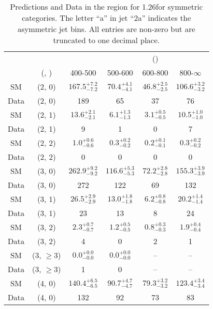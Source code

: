 \begin{table}[h!]
\tiny
\centering
\caption{Predictions and Data in the \gj region for 1.26\ifb for symmetric categories. The letter ``a'' in jet \eg ``2a''  indicates the asymmetric jet bins. All entries are non-zero but are truncated to one decimal place.\label{tab:yieldsewkdatapost_gj_comb_sym}}
\begin{tabular}
{cccccc}
	\hline\hline
&	&	& \multicolumn{4}{c}{\scalht (\gev)}\\ 
	&	 (\njet, \nb) & 400-500 & 500-600 & 600-800 & 800-$\infty$ \\ [0.8ex] 
\hline
	SM & (2, 0) & $167.5^{+ 7.2 }_{- 7.2 }$ & $70.4^{+ 4.1 }_{- 4.1 }$ & $46.8^{+ 2.5 }_{- 2.5 }$ & $106.6^{+ 3.2 }_{- 3.2 }$ \\[0.5ex] 
	Data & (2, 0) & 189 & 65 & 37 & 76 \\[0.5ex] 
	SM & (2, 1) & $13.6^{+ 2.1 }_{- 2.1 }$ & $6.1^{+ 1.3 }_{- 1.3 }$ & $3.1^{+ 0.5 }_{- 0.5 }$ & $10.5^{+ 1.0 }_{- 1.0 }$ \\[0.5ex] 
	Data & (2, 1) & 9 & 1 & 0 & 7 \\[0.5ex] 
	SM & (2, 2) & $1.0^{+ 0.6 }_{- 0.6 }$ & $0.3^{+ 0.2 }_{- 0.2 }$ & $0.2^{+ 0.1 }_{- 0.1 }$ & $0.3^{+ 0.2 }_{- 0.2 }$ \\[0.5ex] 
	Data & (2, 2) & 0 & 0 & 0 & 0 \\[0.5ex] 
	SM & (3, 0) & $262.9^{+ 9.2 }_{- 9.2 }$ & $116.6^{+ 5.3 }_{- 5.3 }$ & $72.2^{+ 2.8 }_{- 2.8 }$ & $155.3^{+ 3.9 }_{- 3.9 }$ \\[0.5ex] 
	Data & (3, 0) & 272 & 122 & 69 & 132 \\[0.5ex] 
	SM & (3, 1) & $26.5^{+ 2.9 }_{- 2.9 }$ & $13.0^{+ 1.8 }_{- 1.8 }$ & $6.2^{+ 0.8 }_{- 0.8 }$ & $20.2^{+ 1.4 }_{- 1.4 }$ \\[0.5ex] 
	Data & (3, 1) & 23 & 13 & 8 & 24 \\[0.5ex] 
	SM & (3, 2) & $2.3^{+ 0.7 }_{- 0.7 }$ & $1.2^{+ 0.5 }_{- 0.5 }$ & $0.8^{+ 0.3 }_{- 0.3 }$ & $1.9^{+ 0.4 }_{- 0.4 }$ \\[0.5ex] 
	Data & (3, 2) & 4 & 0 & 2 & 1 \\[0.5ex] 
	SM & (3, $\ge3$) & $0.0^{+ 0.0 }_{- 0.0 }$ & $0.0^{+ 0.0 }_{- 0.0 }$ & -- & -- \\[0.5ex] 
	Data & (3, $\ge3$) & 1 & 0 & -- & -- \\[0.5ex] 
	SM & (4, 0) & $140.4^{+ 6.5 }_{- 6.5 }$ & $90.7^{+ 4.7 }_{- 4.7 }$ & $79.3^{+ 3.2 }_{- 3.2 }$ & $123.4^{+ 3.4 }_{- 3.4 }$ \\[0.5ex] 
	Data & (4, 0) & 132 & 92 & 73 & 83 \\[0.5ex] 

\end{tabular}
\end{table}
